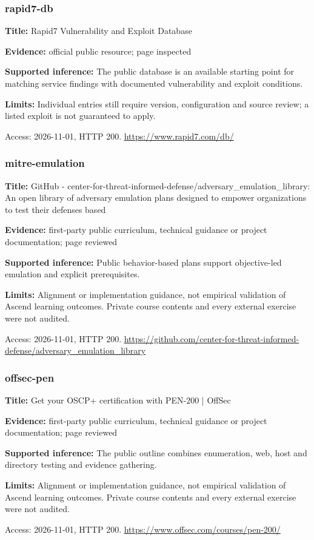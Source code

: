 \subsubsection{rapid7-db}
\noindent\textbf{Title:} Rapid7 Vulnerability and Exploit Database\par
\noindent\textbf{Evidence:} official public resource; page inspected\par
\noindent\textbf{Supported inference:} The public database is an available starting point for matching service findings with documented vulnerability and exploit conditions.\par
\noindent\textbf{Limits:} Individual entries still require version, configuration and source review; a listed exploit is not guaranteed to apply.\par
\noindent Access: 2026-11-01, HTTP 200. \url{https://www.rapid7.com/db/}
\subsubsection{mitre-emulation}
\noindent\textbf{Title:} GitHub - center-for-threat-informed-defense/adversary\_emulation\_library: An open library of adversary emulation plans designed to empower organizations to test their defenses based\par
\noindent\textbf{Evidence:} first-party public curriculum, technical guidance or project documentation; page reviewed\par
\noindent\textbf{Supported inference:} Public behavior-based plans support objective-led emulation and explicit prerequisites.\par
\noindent\textbf{Limits:} Alignment or implementation guidance, not empirical validation of Ascend learning outcomes. Private course contents and every external exercise were not audited.\par
\noindent Access: 2026-11-01, HTTP 200. \url{https://github.com/center-for-threat-informed-defense/adversary_emulation_library}
\subsubsection{offsec-pen}
\noindent\textbf{Title:} Get your OSCP+ certification with PEN-200 | OffSec\par
\noindent\textbf{Evidence:} first-party public curriculum, technical guidance or project documentation; page reviewed\par
\noindent\textbf{Supported inference:} The public outline combines enumeration, web, host and directory testing and evidence gathering.\par
\noindent\textbf{Limits:} Alignment or implementation guidance, not empirical validation of Ascend learning outcomes. Private course contents and every external exercise were not audited.\par
\noindent Access: 2026-11-01, HTTP 200. \url{https://www.offsec.com/courses/pen-200/}
